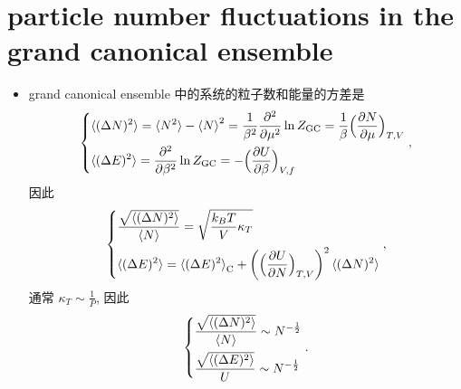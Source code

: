 \section{particle number fluctuations in the grand canonical ensemble}
\begin{itemize}
	\item grand canonical ensemble 中的系统的粒子数和能量的方差是
	\begin{equation}
		\begin{dcases}
			\braket{(\Delta N)^2} = \braket{N^2} - \braket{N}^2 = \frac{1}{\beta^2} \frac{\partial^2}{\partial \mu^2} \ln Z_\text{GC} = \frac{1}{\beta} \Big( \frac{\partial N}{\partial \mu} \Big)_{T, V} \\
			\braket{(\Delta E)^2} = \frac{\partial^2}{\partial \beta^2} \ln Z_\text{GC} = - \Big( \frac{\partial U}{\partial \beta} \Big)_{V, f}
		\end{dcases},
	\end{equation}
	因此
	\begin{equation}
		\begin{dcases}
			\frac{\sqrt{\braket{(\Delta N)^2}}}{\braket{N}} = \sqrt{\frac{k_B T}{V} \kappa_T} \\
			\braket{(\Delta E)^2} = \braket{(\Delta E)^2}_\text{C} + \bigg( \Big( \frac{\partial U}{\partial N} \Big)_{T, V} \bigg)^2 \braket{(\Delta N)^2}
		\end{dcases},
	\end{equation}
	通常 $\kappa_T \sim \frac{1}{P}$, 因此
	\begin{equation}
		\begin{dcases}
			\frac{\sqrt{\braket{(\Delta N)^2}}}{\braket{N}} \sim N^{- \frac{1}{2}} \\
			\frac{\sqrt{\braket{(\Delta E)^2}}}{U} \sim N^{- \frac{1}{2}}
		\end{dcases}.
	\end{equation}
	

\end{itemize}

